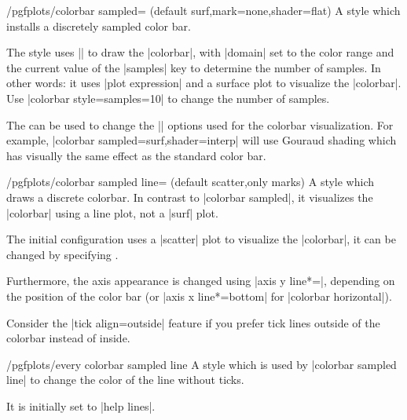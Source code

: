 \begin{stylekey}{/pgfplots/colorbar sampled= (default surf,mark=none,shader=flat)}
	A style which installs a discretely sampled color bar.
\begin{codeexample}[]
\end{codeexample}
	The style uses || to draw the |colorbar|, with |domain| set to the color range and the current value of the |samples| key to determine the number of samples. In other words: it uses |plot expression| and a surface plot to visualize the |colorbar|. Use |colorbar style={samples=10}| to change the number of samples.
\begin{codeexample}[]
\end{codeexample}
	The  can be used to change the || options used for the colorbar visualization. For example, |colorbar sampled={surf,shader=interp}| will use Gouraud shading which has visually the same effect as the standard color bar.
\end{stylekey}

\begin{stylekey}{/pgfplots/colorbar sampled line= (default scatter,only marks)}
	A style which draws a discrete colorbar. In contrast to |colorbar sampled|, it visualizes the |colorbar| using a line plot, not a |surf| plot.
\begin{codeexample}[]
\end{codeexample}
	The initial configuration uses a |scatter| plot to visualize the |colorbar|, it can be changed by specifying .

	Furthermore, the axis appearance is changed using |axis y line*=|, depending on the position of the color bar (or |axis x line*=bottom| for |colorbar horizontal|).

	Consider the |tick align=outside| feature if you prefer tick lines outside of the colorbar instead of inside.

	\begin{stylekey}{/pgfplots/every colorbar sampled line}
		A style which is used by |colorbar sampled line| to change the color of the line without ticks.

		It is initially set to |help lines|.
	\end{stylekey}
\end{stylekey}

